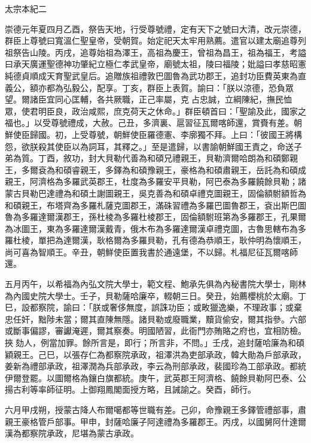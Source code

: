 
\begin{pinyinscope}
太宗本紀二

崇德元年夏四月乙酉，祭告天地，行受尊號禮，定有天下之號曰大清，改元崇德，群臣上尊號曰寬溫仁聖皇帝，受朝賀。始定祀天太牢用熟薦。遣官以建太廟追尊列祖祭告山陵。丙戌，追尊始祖為澤王，高祖為慶王，曾祖為昌王，祖為福王，考謚曰承天廣運聖德神功肇紀立極仁孝武皇帝，廟號太祖，陵曰福陵；妣謚曰孝慈昭憲純德貞順成天育聖武皇后。追贈族祖禮敦巴圖魯為武功郡王，追封功臣費英東為直義公，額亦都為弘毅公，配享。丁亥，群臣上表賀。諭曰：「朕以涼德，恐負眾望。爾諸臣宜同心匡輔，各共厥職，正己率屬，克占忠誠，立綱陳紀，撫民恤眾，使君明臣良，政治咸熙，庶克荷天之休命。」群臣頓首曰：「聖諭及此，國家之福也。」以受尊號禮成，大赦。己丑，多濟裏、扈習征瓦爾喀師還，賞賚有差。朝鮮使臣歸國。初，上受尊號，朝鮮使臣羅德憲、李廓獨不拜。上曰：「彼國王將構怨，欲朕殺其使臣以為詞耳，其釋之。」至是遣歸，以書諭朝鮮國王責之，命送子弟為質。丁酉，敘功，封大貝勒代善為和碩兄禮親王，貝勒濟爾哈朗為和碩鄭親王，多爾袞為和碩睿親王，多鐸為和碩豫親王，豪格為和碩肅親王，岳託為和碩成親王，阿濟格為多羅武英郡王，杜度為多羅安平貝勒，阿巴泰為多羅饒餘貝勒；諸蒙古貝勒巴達禮為和碩土謝圖親王，吳克善為和碩卓禮克圖親王，固倫額駙額哲為和碩親王，布塔齊為多羅札薩克圖郡王，滿硃習禮為多羅巴圖魯郡王，袞出斯巴圖魯為多羅達爾漢郡王，孫杜棱為多羅杜棱郡王，固倫額駙班第為多羅郡王，孔果爾為冰圖王，東為多羅達爾漢戴青，俄木布為多羅達爾漢卓禮克圖，古魯思轄布為多羅杜棱，單把為達爾漢，耿格爾為多羅貝勒，孔有德為恭順王，耿仲明為懷順王，尚可喜為智順王。辛丑，朝鮮使臣置我書於通遠堡，不以歸。札福尼征瓦爾喀師還。

五月丙午，以希福為內弘文院大學士，範文程、鮑承先俱為內秘書院大學士，剛林為內國史院大學士。壬子，貝勒薩哈廉卒，輟朝三日。癸丑，始薦櫻桃於太廟。丁巳，設都察院，諭曰：「朕或奢侈無度，誤誅功臣；或畋獵逸樂，不理政事；或棄忠任奸，黜陟未當；爾其直陳無隱。諸貝勒或廢職業，黷貨偷安，爾其指參。六部或斷事偏謬，審讞淹遲，爾其察奏。明國陋習，此衙門亦賄賂之府也，宜相防檢。挾劾人，例當加罪。餘所言是，即行；所言非，不問。」壬戌，追封薩哈廉為和碩穎親王。己巳，以張存仁為都察院承政，祖澤洪為吏部承政，韓大勛為戶部承政，姜新為禮部承政，祖澤潤為兵部承政，李云為刑部承政，裴國珍為工部承政。都統伊爾登罷。以圖爾格為鑲白旗都統。庚午，武英郡王阿濟格、饒餘貝勒阿巴泰、公揚古利等率師征明。上御翔鳳閣面授方略，且誡諭之。癸酉，師行。

六月甲戌朔，授蒙古降人布爾噶都等世職有差。己卯，命豫親王多鐸管禮部事，肅親王豪格管戶部事。甲申，封薩哈廉子阿達禮為多羅郡王。丙戌，以國舅阿什達爾漢為都察院承政，尼堪為蒙古承政。


\end{pinyinscope}
